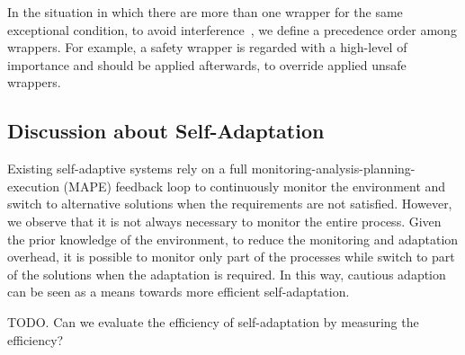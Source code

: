 In the situation in which there are more than one wrapper for the same exceptional condition, to avoid interference~\cite{Katz:2008:IAI:1394496.1394500}, we define a precedence order among wrappers. For example, a safety wrapper is regarded with a high-level of importance and should be applied afterwards, to override applied unsafe wrappers. 

\subsection{Discussion about Self-Adaptation}

Existing self-adaptive systems rely on a full monitoring-analysis-planning-execution (MAPE) feedback loop to continuously monitor the environment and switch to alternative solutions when the requirements are not satisfied.
However, we observe that it is not always necessary to monitor the entire process. Given the prior knowledge of the environment, to reduce the monitoring and adaptation overhead, it is possible to monitor only part of the processes while switch to part of the solutions when the adaptation is required. 
In this way, cautious adaption can be seen as a means towards more efficient self-adaptation.

TODO. Can we evaluate the efficiency of self-adaptation by measuring the efficiency?